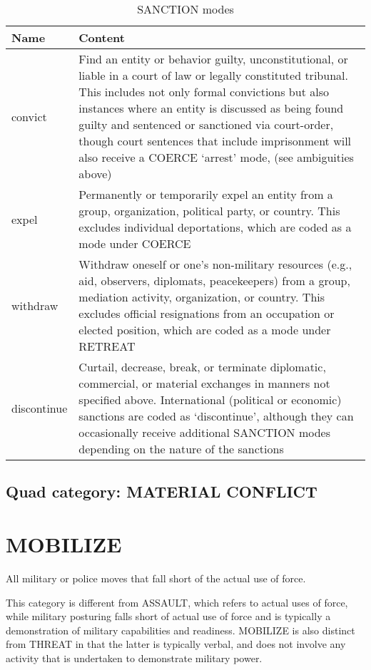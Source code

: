 \documentclass[11pt]{report}
\newcommand{\plcat}[1]{\textsf{#1}}
\begin{document}
\begin{table}[htp]
\caption{SANCTION modes}
\begin{center}
\begin{tabular}{|l|p{13cm}|}
\hline
Name & Content \\
\hline
convict &  Find an entity or behavior guilty, unconstitutional, or liable in a court of law or legally constituted tribunal. This includes not only formal convictions but also instances where an entity is discussed as being found guilty and sentenced or sanctioned via court-order, though court sentences that include imprisonment will also receive a \plcat{COERCE} `arrest' mode, (see ambiguities above)\\
expel & Permanently or temporarily expel an entity from a group, organization, political party, or country. This excludes individual deportations, which are coded as a mode under \plcat{COERCE}\\
withdraw & Withdraw oneself or one's non-military resources (e.g., aid, observers, diplomats, peacekeepers) from a group, mediation activity, organization, or country. This excludes official resignations from an occupation or elected position, which are coded as a mode under \plcat{RETREAT}\\
discontinue & Curtail, decrease, break, or terminate diplomatic, commercial, or material exchanges in manners not specified above. International (political or economic) sanctions are coded as `discontinue', although they can occasionally receive additional \plcat{SANCTION} modes depending on the nature of the sanctions \\
\hline
\end{tabular}
\end{center}
\label{tab:sanctionmode}
\end{table}%

\subsection{Quad category: MATERIAL CONFLICT}

\newpage

\section{MOBILIZE}

All military or police moves that fall short of the actual use of force.

This category is different from \plcat{ASSAULT}, which refers to actual uses of force, while military posturing falls short of actual use of force and is typically a demonstration of military capabilities and readiness. \plcat{MOBILIZE} is also distinct from \plcat{THREAT} in that the latter is typically verbal, and does not involve any activity that is undertaken to demonstrate military power.
\end{document}
